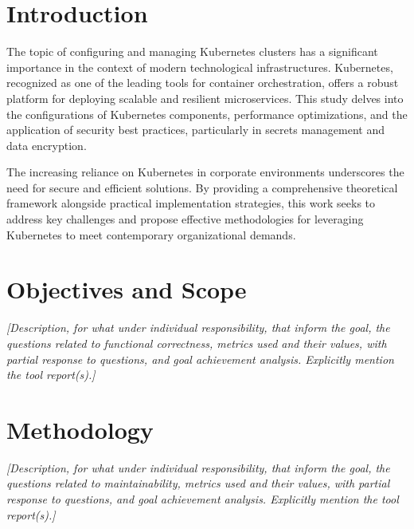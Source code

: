 \documentclass[a4paper,11pt,openright,BCOR=15mm]{scrbook}
\begin{document}
	
	
	
	\tableofcontents
	\listoffigures
	
	
	
	
	\mainmatter 
	
	

	\chapter{Introduction}

The topic of configuring and managing Kubernetes clusters has a significant importance in the context of modern technological infrastructures. Kubernetes, recognized as one of the leading tools for container orchestration, offers a robust platform for deploying scalable and resilient microservices. This study delves into the configurations of Kubernetes components, performance optimizations, and the application of security best practices, particularly in secrets management and data encryption.

The increasing reliance on Kubernetes in corporate environments underscores the need for secure and efficient solutions. By providing a comprehensive theoretical framework alongside practical implementation strategies, this work seeks to address key challenges and propose effective methodologies for leveraging Kubernetes to meet contemporary organizational demands.

	
	\chapter{Objectives and Scope}

\textit{	[Description, for what under individual responsibility, that inform the goal, the questions related to functional correctness, metrics used and their values, with partial response to questions, and goal achievement analysis. Explicitly mention the tool report(s).]}

	
	\chapter{Methodology}
\textit{	[Description, for what under individual responsibility, that inform the goal, the questions related to maintainability, metrics used and their values, with partial response to questions, and goal achievement analysis. Explicitly mention the tool report(s).]}
	
\end{document}
